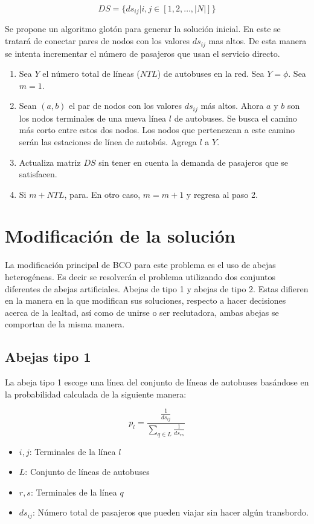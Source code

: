 \documentclass[letterpaper,12pt]{article}
\begin{document}
$$ DS = \{ ds_{ij} | i,j \in [1, 2, \dots , |N|] \}$$

Se propone un algoritmo glotón para generar la solución inicial. En este se
tratará de conectar pares de nodos con los valores $ds_{ij}$ mas altos. De 
esta manera se intenta incrementar el número de pasajeros que usan el 
servicio directo.

\begin{enumerate}
    \itemsep0em 
    \item Sea $Y$ el número total de líneas ($NTL$) de autobuses en la red. 
    Sea $Y = \phi$. Sea $m = 1$.
    \item Sean $(a,b)$ el par de nodos con los valores $ds_{ij}$ más altos. 
    Ahora $a$ y $b$ son los nodos terminales de una nueva línea $l$ de autobuses.
    Se busca el camino más corto entre estos dos nodos. Los nodos que 
    pertenezcan a este camino serán las estaciones de línea de autobús. 
    Agrega $l$ a $Y$.
    \item Actualiza matriz $DS$ sin tener en cuenta la demanda de pasajeros 
    que se satisfacen.
    \item Si $m + NTL$, para. En otro caso, $m = m + 1$ y regresa al paso 2.
\end{enumerate}

\section{Modificación de la solución}

La modificación principal de BCO para este problema es el uso de  abejas 
heterogéneas. Es decir se resolverán el problema utilizando dos conjuntos 
diferentes de abejas artificiales. Abejas de tipo 1 y abejas de tipo 2. 
Estas difieren en la manera en la que modifican sus soluciones, respecto a 
hacer decisiones acerca de la lealtad, así como de unirse o ser reclutadora,
 ambas abejas se comportan de la misma manera.

\subsection{Abejas tipo 1}

La abeja tipo 1 escoge una línea del conjunto de líneas de autobuses basándose
en la probabilidad calculada de la siguiente manera:

$$ p_l = \frac{\frac{1}{ds_{ij}}}{\sum_{q \in L} \frac{1}{ds_{rs}}} $$

\begin{itemize}
    \itemsep0em 
    \item $i,j$: Terminales de la línea $l$
    \item $L$: Conjunto de líneas de autobuses
    \item $r,s$: Terminales de la línea $q$
    \item $ds_{ij}$: Número total de pasajeros que pueden viajar sin hacer algún
    transbordo.
\end{itemize}
\end{document}
